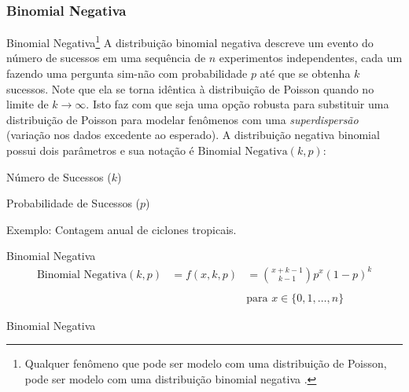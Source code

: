 \subsubsection{Binomial Negativa}
\begin{frame}{Binomial Negativa\footnote{Qualquer fenômeno que pode ser modelo com uma distribuição de Poisson, pode ser modelo com uma distribuição binomial negativa \parencite{gelman2013bayesian, gelman2020regression}.}}
    \small
    A distribuição binomial negativa descreve um evento do número de sucessos em uma
    sequência de $n$ experimentos independentes, cada um fazendo uma pergunta sim-não
    com probabilidade $p$ até que se obtenha $k$ sucessos. Note que ela se torna
    idêntica à distribuição de Poisson quando no limite de $k \to \infty$. Isto faz
    com que seja uma opção robusta para substituir uma distribuição de Poisson para
    modelar fenômenos com uma \textit{superdispersão} (variação nos dados excedente ao
    esperado).
    \vfill \small
    A distribuição negativa binomial possui dois parâmetros e sua notação é
    $\text{Binomial Negativa}(k, p)$:
    \begin{vfilleditems}
        \small
        \item Número de Sucessos ($k$)
        \item Probabilidade de Sucessos ($p$)
    \end{vfilleditems}
    \vfil \small
    Exemplo: Contagem anual de ciclones tropicais.
\end{frame}

\begin{frame}{Binomial Negativa}
    $$
    \begin{aligned}
        \text{Binomial Negativa}(k, p) &= f(x, k, p) &= \binom{x + k - 1}{k - 1}p^{x}(1-p)^{k} \\
        \\
        &~ &\text{para $x \in \{0, 1, \dots, n\}$}
    \end{aligned}
    $$
\end{frame}

\begin{frame}{Binomial Negativa}
  \centering
\end{frame}

